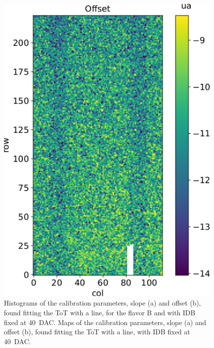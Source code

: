 \begin{figure}[h!]
            \includegraphics[width=.49\linewidth]{figures/charaterization/offset_map.pdf}
            \caption{Histograms of the calibration parameters, slope (a) and offset (b), found fitting the ToT with a line, for the flavor B and with IDB fixed at \SI{40}{DAC}. Maps of the calibration parameters, slope (a) and offset (b), found fitting the ToT with a line, with IDB fixed at \SI{40}{DAC}.}
            \label{fig:ToT_histograms_all_fl}
        \end{figure} 
        
